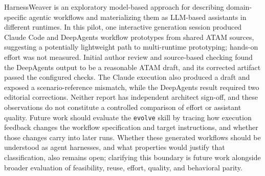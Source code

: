 \documentclass[10pt,conference]{IEEEtran}
\begin{document}
HarnessWeaver is an exploratory model-based approach for describing domain-specific agentic workflows and materializing them as LLM-based assistants in different runtimes. In this pilot, one interactive generation session produced Claude Code and DeepAgents workflow prototypes from shared ATAM sources, suggesting a potentially lightweight path to multi-runtime prototyping; hands-on effort was not measured. Initial author review and source-based checking found the DeepAgents output to be a reasonable ATAM draft, and its corrected artifact passed the configured checks. The Claude execution also produced a draft and exposed a scenario-reference mismatch, while the DeepAgents result required two editorial corrections. Neither report has independent architect sign-off, and these observations do not constitute a controlled comparison of effort or assistant quality. Future work should evaluate the \texttt{evolve} skill by tracing how execution feedback changes the workflow specification and target instructions, and whether those changes carry into later runs. Whether these generated workflows should be understood as agent harnesses, and what properties would justify that classification, also remains open; clarifying this boundary is future work alongside broader evaluation of feasibility, reuse, effort, quality, and behavioral parity.
\end{document}
